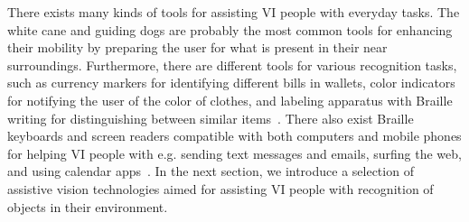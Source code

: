 
There exists many kinds of tools for assisting VI people with everyday tasks. The white cane and guiding dogs are probably the most common tools for enhancing their mobility by preparing the user for what is present in their near surroundings. Furthermore, there are different tools for various recognition tasks, such as currency markers for identifying different bills in wallets, color indicators for notifying the user of the color of clothes, and labeling apparatus with Braille writing for distinguishing between similar items~\cite{srf2017vardagstips}. There also exist Braille keyboards and screen readers compatible with both computers and mobile phones for helping VI people with e.g. sending text messages and emails, surfing the web, and using calendar apps~\cite{gotesson2019challenges}. In the next section, we introduce a selection of assistive vision technologies aimed for assisting VI people with recognition of objects in their environment. 
 


